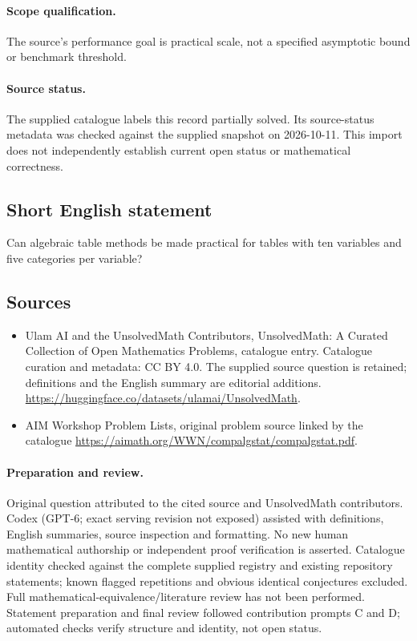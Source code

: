 \documentclass[11pt]{article}
\begin{document}
\paragraph{Scope qualification.}
The source's performance goal is practical scale, not a specified asymptotic bound or benchmark threshold.
\paragraph{Source status.}
The supplied catalogue labels this record partially solved. Its source-status metadata was checked against the supplied snapshot on 2026-10-11. This import does not independently establish current open status or mathematical correctness.
\subsection{Short English statement}
Can algebraic table methods be made practical for tables with ten variables and five categories per variable?
\subsection{Sources}
\begin{itemize}
\item[S1] Ulam AI and the UnsolvedMath Contributors, UnsolvedMath: A Curated Collection of Open Mathematics Problems, catalogue entry. Catalogue curation and metadata: CC BY 4.0. The supplied source question is retained; definitions and the English summary are editorial additions.
\url{https://huggingface.co/datasets/ulamai/UnsolvedMath}.
\item[S2] AIM Workshop Problem Lists, original problem source linked by the catalogue
\url{https://aimath.org/WWN/compalgstat/compalgstat.pdf}.
\end{itemize}
\paragraph{Preparation and review.}
Original question attributed to the cited source and UnsolvedMath contributors. Codex (GPT-6; exact serving revision not exposed) assisted with definitions, English summaries, source inspection and formatting. No new human mathematical authorship or independent proof verification is asserted. Catalogue identity checked against the complete supplied registry and existing repository statements; known flagged repetitions and obvious identical conjectures excluded. Full mathematical-equivalence/literature review has not been performed. Statement preparation and final review followed contribution prompts C and D; automated checks verify structure and identity, not open status.
\label{end:statement}
\end{document}

